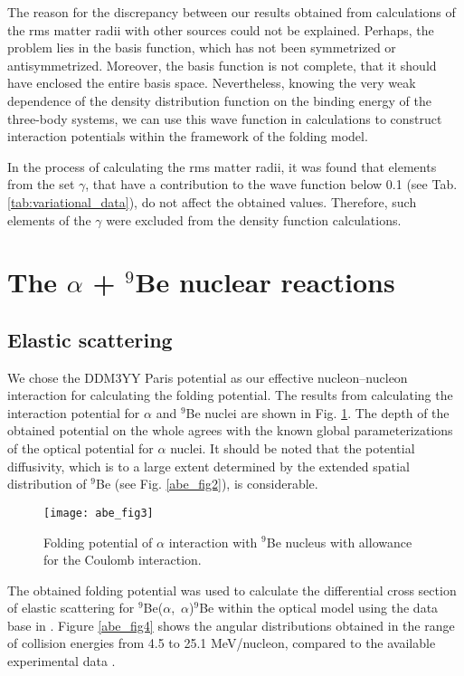 \documentclass[
12pt, %
oneside, %
english, %
onehalfspacing, %
onehalfspacing, %
headsepline, %
]{MastersDoctoralThesis} %
\begin{document}
The reason for the discrepancy between our results obtained from calculations of the rms matter radii with other sources could not be explained. Perhaps, the problem lies in the basis function, which has not been symmetrized or antisymmetrized. Moreover, the basis function is not complete, that it should have enclosed the entire basis space. Nevertheless, knowing the very weak dependence of the density distribution function on the binding energy of the three-body systems, we can use this wave function in calculations to construct interaction potentials within the framework of the folding model.

In the process of calculating the rms matter radii, it was found that elements from the set $\gamma$, that have a contribution to the wave function below 0.1 (see Tab.\ref{tab:variational_data}), do not affect the obtained values. Therefore, such elements of the $\gamma$ were excluded from  the density function calculations.



\section{The $\alpha$ + $^9$Be nuclear reactions}
\subsection{Elastic scattering}
We chose the DDM3YY Paris potential \cite{anantaraman1983effective} as our effective nucleon–nucleon interaction for calculating the folding potential. 
The results from calculating the interaction potential for $\alpha$ and ${}^9$Be nuclei are shown in Fig. \ref{abe_fig3}.
 The depth of the obtained potential on the whole agrees with the known global parameterizations of the optical potential for $\alpha$ nuclei. 
 It should be noted that the potential diffusivity, which is to a large extent determined by the extended spatial distribution of ${}^9$Be (see Fig. \ref{abe_fig2}), is considerable.


\begin{figure}[tp]
\centering
\texttt{[image: abe\_fig3]}
\decoRule
\caption{  \footnotesize  Folding potential of $\alpha$ interaction with $^9$Be nucleus with allowance for the Coulomb interaction.
}
\label{abe_fig3}
\end{figure}


The obtained folding potential was used to calculate the differential cross section of elastic scattering for ${}^9$Be($\alpha$,~$\alpha$)${}^9$Be within the optical model using the data base in \citep{nrv}. 
Figure \ref{abe_fig4} shows the angular distributions obtained in the range of collision energies from 4.5 to 25.1 MeV/nucleon, compared to the available experimental data \cite{lucas1964scattering,burtebaev2002,hauser1969elastic}. 
\end{document}
